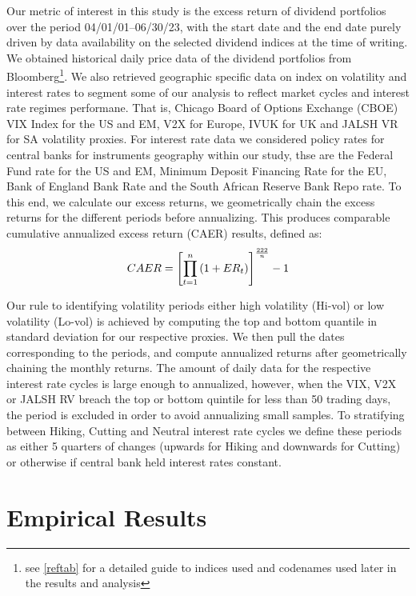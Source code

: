 \documentclass[10pt,preprint, authoryear]{elsarticle}
\numberwithin{equation}{section}
\numberwithin{figure}{section}
\numberwithin{table}{section}
\let\rmarkdownfootnote\footnote%
\def\footnote{\protect\rmarkdownfootnote}
\begin{document}
Our metric of interest in this study is the excess return of dividend
portfolios over the period 04/01/01--06/30/23, with the start date and
the end date purely driven by data availability on the selected dividend
indices at the time of writing. We obtained historical daily price data
of the dividend portfolios from Bloomberg\footnote{see \ref{reftab} for
  a detailed guide to indices used and codenames used later in the
  results and analysis}. We also retrieved geographic specific data on
index on volatility and interest rates to segment some of our analysis
to reflect market cycles and interest rate regimes performane. That is,
Chicago Board of Options Exchange (CBOE) VIX Index for the US and EM,
V2X for Europe, IVUK for UK and JALSH VR for SA volatility proxies. For
interest rate data we considered policy rates for central banks for
instruments geography within our study, thse are the Federal Fund rate
for the US and EM, Minimum Deposit Financing Rate for the EU, Bank of
England Bank Rate and the South African Reserve Bank Repo rate. To this
end, we calculate our excess returns, we geometrically chain the excess
returns for the different periods before annualizing. This produces
comparable cumulative annualized excess return (CAER) results, defined
as: \begin{align}
C A E R=\left[\prod_{t=1}^n\left(1+E R_t\right)\right]^{\frac{222}{n}}-1 \notag
\end{align}

Our rule to identifying volatility periods either high volatility
(Hi-vol) or low volatility (Lo-vol) is achieved by computing the top and
bottom quantile in standard deviation for our respective proxies. We
then pull the dates corresponding to the periods, and compute annualized
returns after geometrically chaining the monthly returns. The amount of
daily data for the respective interest rate cycles is large enough to
annualized, however, when the VIX, V2X or JALSH RV breach the top or
bottom quintile for less than 50 trading days, the period is excluded in
order to avoid annualizing small samples. To stratifying between Hiking,
Cutting and Neutral interest rate cycles we define these periods as
either 5 quarters of changes (upwards for Hiking and downwards for
Cutting) or otherwise if central bank held interest rates constant.

\hypertarget{empirical-results}{%
\section*{Empirical Results}\label{empirical-results}}
\end{document}
